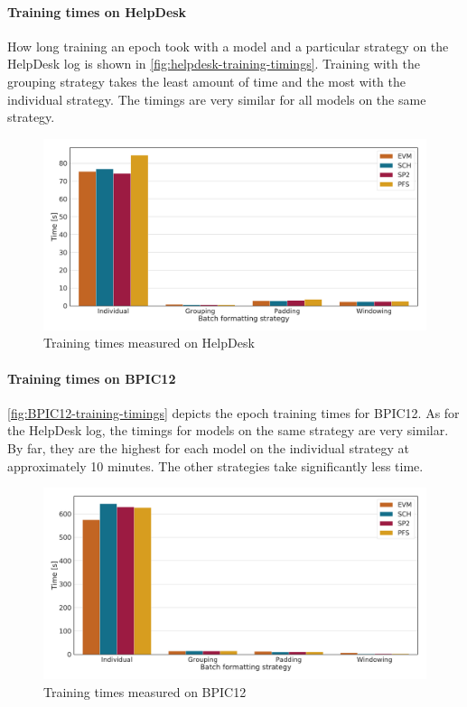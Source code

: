 \paragraph{Training times on HelpDesk}
How long training an epoch took with a model and a particular strategy on the HelpDesk log is shown in \autoref{fig:helpdesk-training-timings}.
Training with the grouping strategy takes the least amount of time and the most with the individual strategy.
The timings are very similar for all models on the same strategy.

\begin{figure}[!htb]
    \centering
    \includegraphics[width=\textwidth]{gfx/helpdesk/train_timings.pdf}
    \caption{Training times measured on HelpDesk}
    \label{fig:helpdesk-training-timings}
\end{figure}

\paragraph{Training times on BPIC12}
\autoref{fig:BPIC12-training-timings} depicts the epoch training times for BPIC12.
As for the HelpDesk log, the timings for models on the same strategy are very similar.
By far, they are the highest for each model on the individual strategy at approximately 10 minutes.
The other strategies take significantly less time.

\begin{figure}[!htb]
    \centering
    \includegraphics[width=\textwidth]{gfx/bpic2012/train_timings.pdf}
    \caption{Training times measured on BPIC12}
    \label{fig:BPIC12-training-timings}
\end{figure}

